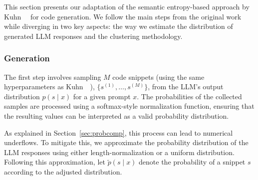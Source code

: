 This section presents our adaptation of the semantic entropy-based approach by Kuhn~\etal~\cite{kuhnsemantic} for code generation. 
We follow the main steps from the original work while diverging in two key aspects: the way we estimate the distribution of generated LLM responses and the clustering methodology.


\subsubsection{Generation}
The first step involves sampling $M$ code snippets (using the same hyperparameters as Kuhn~\etal~\cite{kuhnsemantic}), $\{s^{(1)}, \ldots, s^{(M)}\}$, from the LLM's output distribution $p(s \mid x)$ for a given prompt $x$. 
The probabilities of the collected samples are processed using a softmax-style normalization function, ensuring that the resulting values can be interpreted as a valid probability distribution.

As explained in Section~\ref{sec:probcomp}, this process can lead to numerical underflows. 
To mitigate this, we approximate the probability distribution of the LLM responses using either length-normalization or a uniform distribution.
%
Following this approximation, let \(\tilde{p}(s \mid x)\) denote the probability of a snippet \(s\) according to the adjusted distribution.




